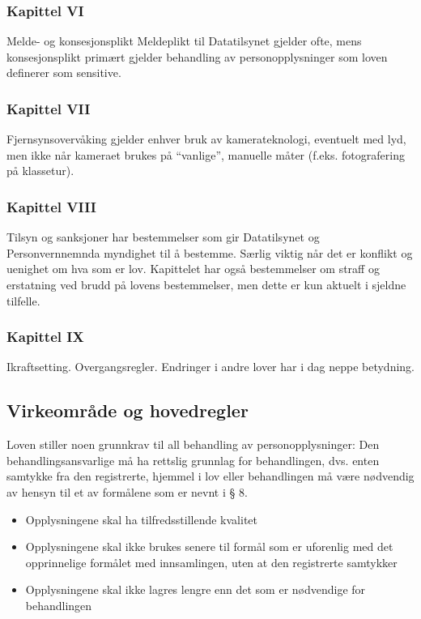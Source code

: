 \documentclass[11pt]{article}
\begin{document}
\subsubsection{Kapittel VI}
\label{sec-17.2.6}

    Melde- og konsesjonsplikt Meldeplikt til Datatilsynet gjelder ofte, mens konsesjonsplikt 
    primært gjelder behandling av personopplysninger som loven definerer som sensitive.
\subsubsection{Kapittel VII}
\label{sec-17.2.7}

    Fjernsynsovervåking gjelder enhver bruk av kamerateknologi, eventuelt med lyd, men
    ikke når kameraet brukes på ``vanlige'', manuelle måter (f.eks. fotografering på 
    klassetur).
\subsubsection{Kapittel VIII}
\label{sec-17.2.8}

    Tilsyn og sanksjoner har bestemmelser som gir Datatilsynet og Personvernnemnda
    myndighet til å bestemme. Særlig viktig når det er konflikt og uenighet om hva 
    som er lov. Kapittelet har også bestemmelser om straff og erstatning ved brudd
    på lovens bestemmelser, men dette er kun aktuelt i sjeldne tilfelle.
\subsubsection{Kapittel IX}
\label{sec-17.2.9}

    Ikraftsetting. Overgangsregler. Endringer i andre lover har i dag neppe betydning.
\subsection{Virkeområde og hovedregler}
\label{sec-17.3}

   Loven stiller noen grunnkrav til all behandling av personopplysninger:
   Den behandlingsansvarlige må ha rettslig grunnlag for behandlingen, dvs. enten samtykke fra den registrerte, hjemmel i lov eller behandlingen må være nødvendig av hensyn til et av formålene som er nevnt i § 8.
\begin{itemize}
\item Opplysningene skal ha tilfredsstillende kvalitet
\item Opplysningene skal ikke brukes senere til formål som er uforenlig med det
     opprinnelige formålet med innsamlingen, uten at den registrerte samtykker
\item Opplysningene skal ikke lagres lengre enn det som er nødvendige for behandlingen
\end{itemize}
\end{document}
